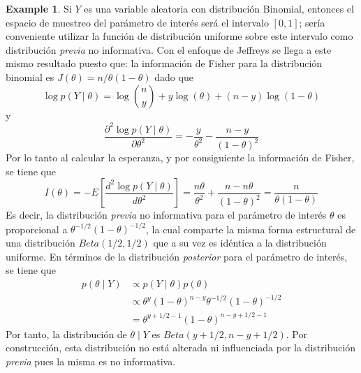 \documentclass[
  spanish,
  letter]{book}
\theoremstyle{definition}
\theoremstyle{definition}
\newtheorem{example}{Example}[chapter]
\theoremstyle{definition}
\theoremstyle{remark}
\begin{document}
\begin{example}
\protect\hypertarget{exm:unnamed-chunk-35}{}{\label{exm:unnamed-chunk-35} }Si \(Y\) es una variable aleatoria con distribución Binomial, entonces el espacio de muestreo del parámetro de interés será el intervalo \([0,1]\); sería conveniente utilizar la función de distribución uniforme sobre este intervalo como distribución \emph{previa} no informativa. Con el enfoque de Jeffreys se llega a este mismo resultado puesto que: la información de Fisher para la distribución binomial es \(J(\theta)=n/\theta(1- \theta)\) dado que
\begin{equation*}
\log p(Y \mid \theta)=\log \binom{n}{y} + y\log(\theta)+(n-y)\log(1-\theta)
\end{equation*}
y
\begin{equation*}
\frac{\partial^2 \log p(Y \mid \theta)}{\partial\theta^2}=-\frac{y}{\theta^2}-\frac{n-y}{(1-\theta)^2}
\end{equation*}
Por lo tanto al calcular la esperanza, y por consiguiente la información de Fisher, se tiene que
\begin{equation*}
I(\theta)=- E\left[\frac{d^2 \log p(Y \mid \theta)}{d\theta^2}\right]
=\frac{n\theta}{\theta^2}+\frac{n-n\theta}{(1-\theta)^2}= \frac{n}{\theta(1-\theta)}
\end{equation*}
Es decir, la distribución \emph{previa} no informativa para el parámetro de interés \(\theta\) es proporcional a \(\theta^{-1/2}(1-\theta)^{-1/2}\), la cual comparte la misma forma estructural de una distribución \(Beta(1/2,1/2)\) que a su vez es idéntica a la distribución uniforme. En términos de la distribución \emph{posterior} para el parámetro de interés, se tiene que
\begin{align*}
p(\theta \mid Y) &\propto p(Y \mid \theta) p(\theta)\\
&\propto \theta^{y}(1-\theta)^{n-y}\theta^{-1/2}(1-\theta)^{-1/2}\\
&=\theta^{y+1/2-1}(1-\theta)^{n-y+1/2-1}
\end{align*}
Por tanto, la distribución de \(\theta \mid Y\) es \(Beta(y+1/2,n-y+1/2)\). Por construcción, esta distribución no está alterada ni influenciada por la distribución \emph{previa} pues la misma es no informativa.
\end{example}
\end{document}
